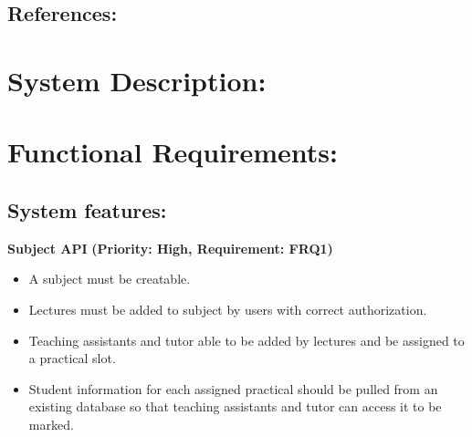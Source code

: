 \documentclass[12pt]{article}
\begin{document}
		
	
	\vspace{0.2in}
	
		\subsection{References:}
		\vspace{0.1in}
			
	
	\vspace{0.5in}
	
	\section{System Description:} %
	\vspace{0.2in}
	
	
	
	\vspace{0.5in}
	
	\newpage
	\section{Functional Requirements:}
	\vspace{0.2in}
		
		\subsection{System features:} %
		\vspace{0.15in}
		
		\hspace{0.2in}\textbf{Subject API}
		\newline\textbf{(Priority: High, Requirement: FRQ1)}
		\begin{itemize}
			\item A subject must be creatable.
			\item Lectures must be added to subject by users with correct authorization.
			\item Teaching assistants and tutor able to be added by lectures and be assigned to a practical slot.
			\item Student information for each assigned practical should be pulled from an existing database so that
					teaching assistants and tutor can access it to be marked.
		\end{itemize}
		
		\vspace{0.15in}
		
\end{document}
